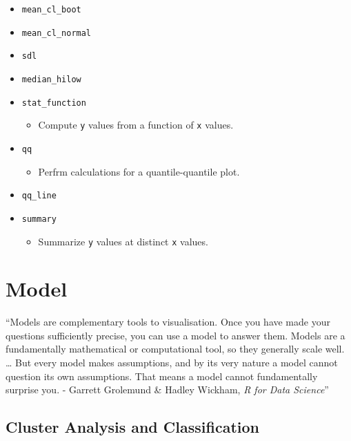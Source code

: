 \documentclass[
]{book}
\providecommand{\tightlist}{%
  \setlength{\itemsep}{0pt}\setlength{\parskip}{0pt}}
\begin{document}
\begin{itemize}
\tightlist
\item
  \texttt{mean\_cl\_boot}
\item
  \texttt{mean\_cl\_normal}
\item
  \texttt{sdl}
\item
  \texttt{median\_hilow}
\item
  \texttt{stat\_function}

  \begin{itemize}
  \tightlist
  \item
    Compute \texttt{y} values from a function of \texttt{x} values.
  \end{itemize}
\item
  \texttt{qq}

  \begin{itemize}
  \tightlist
  \item
    Perfrm calculations for a quantile-quantile plot.
  \end{itemize}
\item
  \texttt{qq\_line}
\item
  \texttt{summary}

  \begin{itemize}
  \tightlist
  \item
    Summarize \texttt{y} values at distinct \texttt{x} values.
  \end{itemize}
\end{itemize}

\hypertarget{model}{%
\chapter{Model}\label{model}}

``Models are complementary tools to visualisation. Once you have made your questions sufficiently precise, you can use a model to answer them. Models are a fundamentally mathematical or computational tool, so they generally scale well. \ldots{} But every model makes assumptions, and by its very nature a model cannot question its own assumptions. That means a model cannot fundamentally surprise you.
- Garrett Grolemund \& Hadley Wickham, \emph{R for Data Science}''

\hypertarget{cluster-analysis-and-classification}{%
\section{Cluster Analysis and Classification}\label{cluster-analysis-and-classification}}
\end{document}
